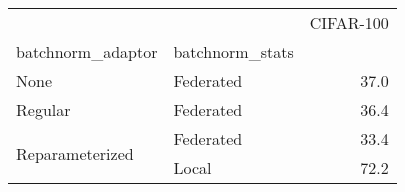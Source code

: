 \begin{tabular}{llr}
\toprule
 &  & CIFAR-100 \\
batchnorm_adaptor & batchnorm_stats &  \\
\midrule
None & Federated & 37.0 \\
\cline{1-3}
Regular & Federated & 36.4 \\
\cline{1-3}
\multirow[t]{2}{*}{Reparameterized} & Federated & 33.4 \\
 & Local & 72.2 \\
\cline{1-3}
\bottomrule
\end{tabular}
